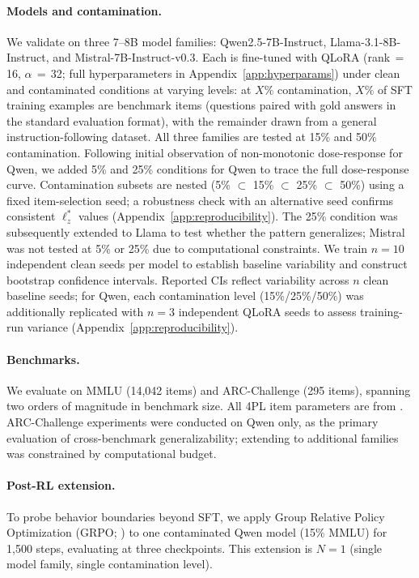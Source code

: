 \paragraph{Models and contamination.}
We validate on three 7--8B model families: Qwen2.5-7B-Instruct, Llama-3.1-8B-Instruct, and Mistral-7B-Instruct-v0.3.
Each is fine-tuned with QLoRA (rank\,$=$\,16, $\alpha$\,$=$\,32; full hyperparameters in Appendix~\ref{app:hyperparams}) under clean and contaminated conditions at varying levels: at $X\%$ contamination, $X\%$ of SFT training examples are benchmark items (questions paired with gold answers in the standard evaluation format), with the remainder drawn from a general instruction-following dataset.
All three families are tested at 15\% and 50\% contamination.
Following initial observation of non-monotonic dose-response for Qwen, we added 5\% and 25\% conditions for Qwen to trace the full dose-response curve.
Contamination subsets are nested (5\% $\subset$ 15\% $\subset$ 25\% $\subset$ 50\%) using a fixed item-selection seed; a robustness check with an alternative seed confirms consistent $\ell_z^*$ values (Appendix~\ref{app:reproducibility}).
The 25\% condition was subsequently extended to Llama to test whether the pattern generalizes; Mistral was not tested at 5\% or 25\% due to computational constraints.
We train $n{=}10$ independent clean seeds per model to establish baseline variability and construct bootstrap confidence intervals.
Reported CIs reflect variability across $n$ clean baseline seeds; for Qwen, each contamination level (15\%/25\%/50\%) was additionally replicated with $n{=}3$ independent QLoRA seeds to assess training-run variance (Appendix~\ref{app:reproducibility}).

\paragraph{Benchmarks.}
We evaluate on MMLU \citep{hendrycks2021mmlu} (14,042 items) and ARC-Challenge \citep{clark2018arc} (295 items), spanning two orders of magnitude in benchmark size.
All 4PL item parameters are from \citet{psnirt2026}.
ARC-Challenge experiments were conducted on Qwen only, as the primary evaluation of cross-benchmark generalizability; extending to additional families was constrained by computational budget.

\paragraph{Post-RL extension.}
To probe behavior boundaries beyond SFT, we apply Group Relative Policy Optimization (GRPO; \citealp{shao2024}) to one contaminated Qwen model (15\% MMLU) for 1,500 steps, evaluating at three checkpoints.
This extension is $N{=}1$ (single model family, single contamination level).

